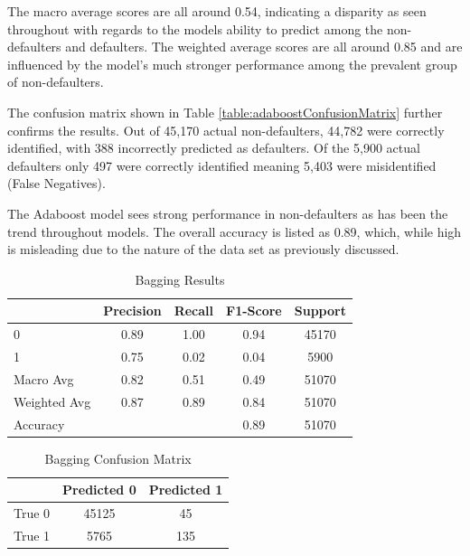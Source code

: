\documentclass[12pt]{article}
\begin{document}
The macro average scores are all around 0.54, indicating a disparity as seen throughout with regards to the models ability to predict among the non-defaulters and defaulters. The weighted average scores are all around 0.85 and are influenced by the model's much stronger performance among the prevalent group of non-defaulters.

The confusion matrix shown in Table \ref{table:adaboostConfusionMatrix} further confirms the results. Out of 45,170 actual non-defaulters, 44,782 were correctly identified, with 388 incorrectly predicted as defaulters. Of the 5,900 actual defaulters only 497 were correctly identified meaning 5,403 were misidentified (False Negatives).

The Adaboost model sees strong performance in non-defaulters as has been the trend throughout models. The overall accuracy is listed as 0.89, which, while high is misleading due to the nature of the data set as previously discussed.

\begin{table}[htbp]
    \centering
    \caption{Bagging Results}
    \begin{tabular}{lcccc}
        \toprule
        & Precision & Recall & F1-Score & Support \\
        \midrule
        0 & 0.89 & 1.00 & 0.94 & 45170 \\
        1 & 0.75 & 0.02 & 0.04 & 5900 \\
        Macro Avg & 0.82 & 0.51 & 0.49 & 51070 \\
        Weighted Avg & 0.87 & 0.89 & 0.84 & 51070 \\
        \midrule
        Accuracy & & & 0.89 & 51070 \\
        \bottomrule
    \end{tabular}
    \label{table:boostingResults}
\end{table}

\begin{table}[htbp]
    \centering
    \caption{Bagging Confusion Matrix}
    \begin{tabular}{lcc}
        \toprule
        & Predicted 0 & Predicted 1 \\
        \midrule
        True 0 & 45125 & 45 \\
        True 1 & 5765 & 135 \\
        \bottomrule
    \end{tabular}
    \label{table:boostingConfusionMatrix}
\end{table}
\end{document}
